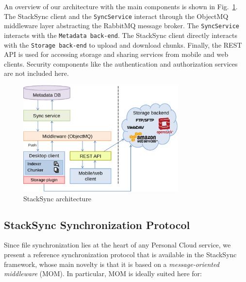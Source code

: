An overview of our architecture with the main components is shown in Fig.~\ref{fig:architecture}. 
The StackSync client and the \texttt{SyncService} interact through the ObjectMQ middleware layer abstracting
the RabbitMQ message broker.  The \texttt{SyncService} interacts with the \texttt{Metadata back-end}. The StackSync client directly interacts with the \texttt{Storage back-end} to upload and download chunks. Finally, the REST API is used for accessing storage and sharing services from mobile
and web clients. Security components like the authentication and authorization services are not included here.

\begin{figure}[t]
\centering
\includegraphics[width=0.75\textwidth]{figures/big_picture_v2}
\caption{StackSync architecture}\label{fig:architecture}
\end{figure}

\subsection{StackSync Synchronization Protocol}

Since file synchronization lies at the heart of any Personal Cloud service, 
we present a reference synchronization protocol that is available in the StackSync framework,
whose main novelty is that it is based on a \textit{message-oriented middleware} (MOM). In particular, 
MOM is ideally suited here for:

